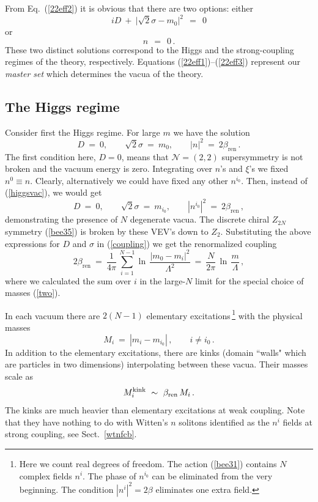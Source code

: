 \documentclass[epsfig,12pt]{article}
\def\beq{\begin{equation}}
\def\eeq{\end{equation}}
\def\beq{\begin{equation}}
\def\eeq{\end{equation}}
\newcommand{\ntwot}{${\mathcal N}= \left(2,2\right) $ }
\newcommand{\bren}{{\beta_\text{ren}}}
\begin{document}
From Eq.~(\ref{22eff2}) it is obvious that there are two options: either
\beq
\label{higgsph22}
	 iD ~+~ \bigl| \sqrt{2}\sigma - m_0 \bigr|^2 ~~=~~ 0  
\eeq
or
\beq
\label{strongph22}
	 n ~~=~~ 0 \,. 
\eeq
	These two distinct solutions correspond to the Higgs and the strong-coupling regimes of the theory, respectively. 
	Equations (\ref{22eff1})--(\ref{22eff3}) represent our {\em master set} which
determines the vacua of the theory. 

\subsection{The Higgs regime}
\label{hireg}

Consider first the Higgs regime.
For large $m$ we have the solution
\beq
D~=~0,\qquad \sqrt{2}\sigma~=~m_0,\qquad |n|^2~=~2\bren \,.
\label{higgsvac}
\eeq
The first condition here, $D=0$, means that \ntwot supersymmetry is not broken and the vacuum
energy is zero. Integrating over $n$'s and $\xi$'s we fixed $n^{0}\equiv n$. Clearly,
alternatively  we could have fixed
any other $n^{i_0}$. Then, instead of (\ref{higgsvac}), we would get
\beq
D~=~0,\qquad \sqrt{2}\sigma~=~m_{i_0},\qquad |n^{i_0}|^2~=~2\bren\,,
\label{higgsvacN}
\eeq
demonstrating the  presence of $N$ degenerate vacua. The discrete chiral $Z_{2N}$ symmetry (\ref{bee35})
is broken by these VEV's down to $Z_2$. Substituting 
the above  expressions   for $D$ and $\sigma$ in (\ref{coupling})
we get the renormalized coupling 
\beq
2\bren~=~\frac{1}{4\pi}\, 
\sum_{i=1}^{N-1}\ln\, {\frac{|m_{0}-m_i|^2}{\Lambda^2}}~=~\frac{N}{2\pi}\,\ln\,{\frac{m}{\Lambda}}\, ,
\label{22higgscoupling}
\eeq
where we calculated the sum over $i$ in the large-$N$ limit for the special choice of masses
(\ref{two}).

In each vacuum there are $2(N-1)$ elementary excitations\,\footnote{Here we count
real degrees of
freedom. The action (\ref{bee31}) contains $N$ complex fields
$n^i$.
The phase of $n^{i_0}$ can be eliminated from the very beginning.
The condition $|n^i|^2 = 2\beta$ eliminates one extra field.} 
with the physical masses
\beq
M_i ~=~ |m_i-m_{i_0}|\,,\qquad i\neq i_0\,.
\label{elmass}
\eeq
In addition to the elementary excitations, there are kinks (domain ``walls" which are particles in two
dimensions) interpolating between these vacua. 
Their masses scale as
\beq
M^{\rm kink}_{i} ~\sim~ \bren\,M_i \,.
\label{kinkmass}
\eeq
The kinks  are much  heavier than elementary
excitations at weak coupling. Note that they have nothing to do
with Witten's $n$ solitons \cite{W79} identified as the $n^i$ fields at
strong coupling, see Sect.~\ref{wtnfcb}.
\end{document}
